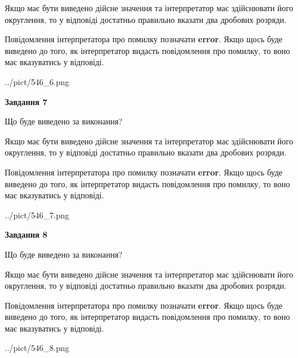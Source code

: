 \documentclass[12pt, ukrainian]{article}
\begin{document}
{\begin {Large}
Якщо має бути виведено дійсне значення та інтерпретатор має здійснювати його округлення, 
то у відповіді достатньо правильно вказати два дробових розряди.

Повідомлення інтерпретатора про помилку позначати \textbf{error}.
Якщо щось буде виведено до того, як інтерпретатор видасть повідомлення про помилку, 
то воно має вказуватись у відповіді. \par

\begin{center}
	{../pict/546_6.png}
\end{center}
\newpage

{\begin {center}\textbf{Завдання 7}\end {center}}\par
Що буде виведено за виконання? \par

Якщо має бути виведено дійсне значення та інтерпретатор має здійснювати його округлення, 
то у відповіді достатньо правильно вказати два дробових розряди.

Повідомлення інтерпретатора про помилку позначати \textbf{error}.
Якщо щось буде виведено до того, як інтерпретатор видасть повідомлення про помилку, 
то воно має вказуватись у відповіді. \par

\begin{center}
	{../pict/546_7.png}
\end{center}
\newpage

{\begin {center}\textbf{Завдання 8}\end {center}}\par
Що буде виведено за виконання? \par

Якщо має бути виведено дійсне значення та інтерпретатор має здійснювати його округлення, 
то у відповіді достатньо правильно вказати два дробових розряди.

Повідомлення інтерпретатора про помилку позначати \textbf{error}.
Якщо щось буде виведено до того, як інтерпретатор видасть повідомлення про помилку, 
то воно має вказуватись у відповіді. \par

\begin{center}
	{../pict/546_8.png}
\end{center}
\newpage


\end{Large}}
\end{document}
